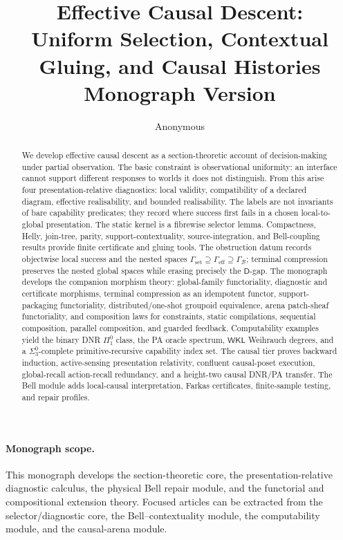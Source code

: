 \documentclass[11pt]{article}
\title{Effective Causal Descent:\\ Uniform Selection, Contextual Gluing, and Causal Histories\\[1mm]
\large Monograph Version}
\author{Anonymous}
\date{}
\theoremstyle{plain}
\theoremstyle{definition}
\theoremstyle{remark}
\begin{document}
\maketitle

\paragraph{Monograph scope.}
This monograph develops the section-theoretic core, the presentation-relative
diagnostic calculus, the physical Bell repair module, and the functorial and
compositional extension theory. Focused articles can be extracted from the
selector/diagnostic core, the Bell--contextuality module, the computability
module, and the causal-arena module.

\begin{abstract}
We develop effective causal descent as a section-theoretic account of
decision-making under partial observation. The basic constraint is observational
uniformity: an interface cannot support different responses to worlds it does not
distinguish. From this arise four presentation-relative diagnostics: local
validity, compatibility of a declared diagram, effective realisability, and
bounded realisability. The labels are not invariants of bare capability
predicates; they record where success first fails in a chosen local-to-global
presentation. The static kernel is a fibrewise selector lemma. Compactness,
Helly, join-tree, parity, support-contextuality, source-integration, and
Bell-coupling results provide finite certificate and gluing tools. The
obstruction datum records objectwise local success and the nested spaces
\(\Gamma_{\mathrm{set}}\supseteq\Gamma_{\mathrm{eff}}\supseteq
\Gamma_{\mathcal B}\); terminal compression preserves the nested global spaces
while erasing precisely the \(\mathsf D\)-gap. The monograph develops the
companion morphism theory: global-family functoriality, diagnostic and
certificate morphisms, terminal compression as an idempotent functor,
support-packaging functoriality, distributed/one-shot groupoid equivalence,
arena patch-sheaf functoriality, and composition laws for constraints, static
compilations, sequential composition, parallel composition, and guarded feedback.
Computability examples yield the binary DNR \(\Pi^0_1\) class, the PA oracle
spectrum, \(\mathsf{WKL}\) Weihrauch degrees, and a \(\Sigma^0_3\)-complete
primitive-recursive capability index set. The causal tier proves backward
induction, active-sensing presentation relativity, confluent causal-poset
execution, global-recall action-recall redundancy, and a height-two causal
DNR/PA transfer. The Bell module adds local-causal interpretation, Farkas
certificates, finite-sample testing, and repair profiles.
\end{abstract}
\end{document}

